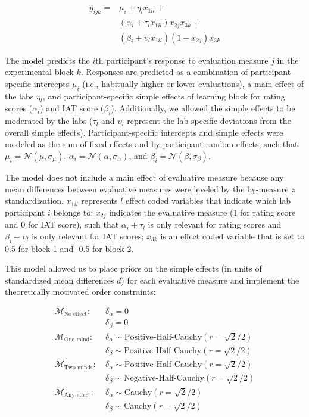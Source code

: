 \documentclass[
  doc]{apa6}
\begin{document}
\[
\begin{aligned}
\hat y_{ijk} = & \mu_i + \eta_l x_{1il} + \\
          & (\alpha_i + \tau_l x_{1il}) x_{2j} x_{3k} + \\
          & (\beta_i + \upsilon_l x_{1il}) (1 -  x_{2j}) x_{3k}
\end{aligned}
\]

The model predicts the \(i\)th participant's response to evaluation measure \(j\) in the experimental block \(k\).
Responses are predicted as a combination of participant-specific intercepts \(\mu_i\) (i.e., habitually higher or lower evaluations), a main effect of the labs \(\eta_l\), and participant-specific simple effects of learning block for rating scores (\(\alpha_i\)) and IAT score (\(\beta_i\)).
Additionally, we allowed the simple effects to be moderated by the labs (\(\tau_l\) and \(\upsilon_l\) represent the lab-specific deviations from the overall simple effects).
Participant-specific intercepts and simple effects were modeled as the sum of fixed effects and by-participant random effects, such that \(\mu_i = \mathcal{N}(\mu, \sigma_\mu)\), \(\alpha_i = \mathcal{N}(\alpha, \sigma_\alpha)\), and \(\beta_i = \mathcal{N}(\beta, \sigma_\beta)\).

The model does not include a main effect of evaluative measure because any mean differences between evaluative measures were leveled by the by-measure \(z\) standardization.
\(x_{1il}\) represents \(l\) effect coded variables that indicate which lab participant \(i\) belongs to; \(x_{2j}\) indicates the evaluative measure (1 for rating score and 0 for IAT score), such that \(\alpha_i + \tau_l\) is only relevant for rating scores and \(\beta_i + \upsilon_l\) is only relevant for IAT scores; \(x_{3k}\) is an effect coded variable that is set to 0.5 for block 1 and -0.5 for block 2.

This model allowed us to place priors on the simple effects (in units of standardized mean differences \(d\)) for each evaluative measure and implement the theoretically motivated order constraints:

\[
\begin{aligned}
\mathcal{M}_\textrm{No effect}:~ & \delta_\alpha = 0 \\ & \delta_\beta = 0 \\
\mathcal{M}_\textrm{One mind}:~ & \delta_\alpha \sim \textrm{Positive-Half-Cauchy}(r = \sqrt2/2) \\ & \delta_\beta \sim \textrm{Positive-Half-Cauchy}(r = \sqrt2/2) \\
\mathcal{M}_\textrm{Two minds}:~ & \delta_\alpha \sim \textrm{Positive-Half-Cauchy}(r = \sqrt2/2) \\ & \delta_\beta \sim \textrm{Negative-Half-Cauchy}(r = \sqrt2/2) \\
\mathcal{M}_\textrm{Any effect}:~ & \delta_\alpha \sim \textrm{Cauchy}(r = \sqrt2/2) \\ & \delta_\beta \sim \textrm{Cauchy}(r = \sqrt2/2)
\end{aligned}
\]
\end{document}
